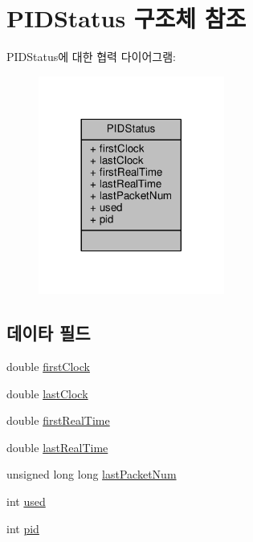 \hypertarget{struct_p_i_d_status}{}\section{P\+I\+D\+Status 구조체 참조}
\label{struct_p_i_d_status}


P\+I\+D\+Status에 대한 협력 다이어그램\+:
\nopagebreak
\begin{figure}[H]
\begin{center}
\leavevmode
\includegraphics[width=173pt]{struct_p_i_d_status__coll__graph}
\end{center}
\end{figure}
\subsection*{데이타 필드}
\begin{DoxyCompactItemize}
\item 
double \hyperlink{struct_p_i_d_status_ad303774d67c02cb29ec6ab6f1f1ce58b}{first\+Clock}
\item 
double \hyperlink{struct_p_i_d_status_a4f3001d09b4b04251fffd4f8908ca24a}{last\+Clock}
\item 
double \hyperlink{struct_p_i_d_status_ab7ee7fd4a6e91c0e09612b85e580f417}{first\+Real\+Time}
\item 
double \hyperlink{struct_p_i_d_status_a615e2d868e1b5f28b84dc49ace77afdd}{last\+Real\+Time}
\item 
unsigned long long \hyperlink{struct_p_i_d_status_af19060817d46a860713e88d67c0e7884}{last\+Packet\+Num}
\item 
int \hyperlink{struct_p_i_d_status_a5810b6407672b8e7aeba609b4bb649de}{used}
\item 
int \hyperlink{struct_p_i_d_status_af500917c052066b40cf47f96b43c607b}{pid}
\end{DoxyCompactItemize}


